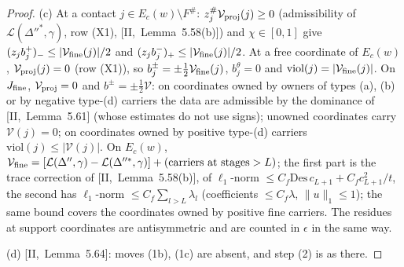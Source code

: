\documentclass[10pt]{amsart}
\theoremstyle{definition}
\theoremstyle{remark}
\begin{document}
\begin{proof}
(c) At a contact $j\in E_c(w)\setminus F^\#$: $z^\#_j\mathcal V_{\rm proj}(j)\ge0$
(admissibility of $\mathcal L(\Delta''^*,\gamma)$, row (X1), [II,~Lemma~5.58(b)])
and $\chi\in[0,1]$ give $(z_jb^+_j)_-\le|\mathcal V_{\rm fine}(j)|/2$ and
$(z_jb^-_j)_+\le|\mathcal V_{\rm fine}(j)|/2$.  At a free coordinate of
$E_c(w)$, $\mathcal V_{\rm proj}(j)=0$ (row (X1)), so $b^\pm_j=\pm\frac12
\mathcal V_{\rm fine}(j)$, $b^\theta_j=0$ and $\mathrm{viol}(j)=|\mathcal V_{\rm
fine}(j)|$.  On $J_{\rm fine}$, $\mathcal V_{\rm proj}=0$ and $b^\pm=\pm\frac12
\mathcal V$: on coordinates owned by owners of types (a), (b) or by negative
type-(d) carriers the data are admissible by the dominance of
[II,~Lemma~5.61] (whose estimates do not use signs); unowned coordinates carry
$\mathcal V(j)=0$; on coordinates owned by positive type-(d) carriers
$\mathrm{viol}(j)\le|\mathcal V(j)|$.  On $E_c(w)$, $\mathcal V_{\rm fine}=
[\mathcal L(\Delta'',\gamma)-\mathcal L(\Delta''^*,\gamma)]+(\text{carriers at
stages}>L)$; the first part is the trace correction of [II,~Lemma~5.58(b)], of
$\ell_1$-norm $\le C_f\mathrm{Des}\,c_{L+1}+C_fc_{L+1}^2/t$, the second has
$\ell_1$-norm $\le C_f\sum_{l>L}\lambda_l$ (coefficients $\le C_f\lambda$,
$\|u\|_1\le1$); the same bound covers the coordinates owned by positive fine
carriers.  The residues at support coordinates are antisymmetric and are counted
in $\epsilon$ in the same way.

(d) [II,~Lemma~5.64]: moves (1b), (1c) are absent, and step (2) is as there.
\end{proof}
\end{document}
